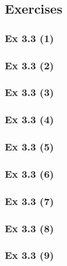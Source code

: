 \subsection{Exercises}\label{sec:3.3_Exercises}

\subsubsection{Ex 3.3 (1)}\label{sec:Ex_3.3.1}

\subsubsection{Ex 3.3 (2)}\label{sec:Ex_3.3.2}

\subsubsection{Ex 3.3 (3)}\label{sec:Ex_3.3.3}

\subsubsection{Ex 3.3 (4)}\label{sec:Ex_3.3.4}

\subsubsection{Ex 3.3 (5)}\label{sec:Ex_3.3.5}

\subsubsection{Ex 3.3 (6)}\label{sec:Ex_3.3.6}

\subsubsection{Ex 3.3 (7)}\label{sec:Ex_3.3.7}

\subsubsection{Ex 3.3 (8)}\label{sec:Ex_3.3.8}

\subsubsection{Ex 3.3 (9)}\label{sec:Ex_3.3.9}


